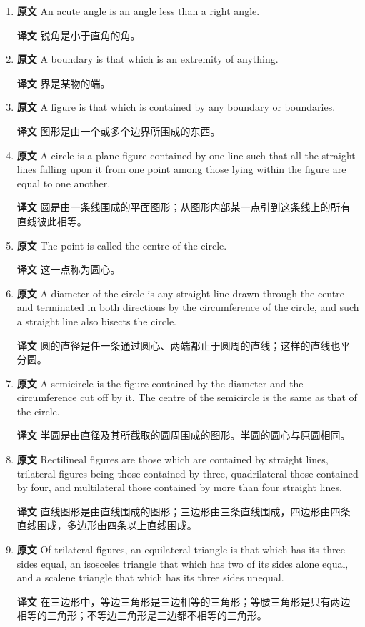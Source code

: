 \documentclass[UTF8,zihao=-4]{ctexart}
\begin{document}
\begin{enumerate}
\item \textbf{原文} An acute angle is an angle less than a right angle. \par\textbf{译文} 锐角是小于直角的角。
\item \textbf{原文} A boundary is that which is an extremity of anything. \par\textbf{译文} 界是某物的端。
\item \textbf{原文} A figure is that which is contained by any boundary or boundaries. \par\textbf{译文} 图形是由一个或多个边界所围成的东西。
\item \textbf{原文} A circle is a plane figure contained by one line such that all the straight lines falling upon it from one point among those lying within the figure are equal to one another. \par\textbf{译文} 圆是由一条线围成的平面图形；从图形内部某一点引到这条线上的所有直线彼此相等。
\item \textbf{原文} The point is called the centre of the circle. \par\textbf{译文} 这一点称为圆心。
\item \textbf{原文} A diameter of the circle is any straight line drawn through the centre and terminated in both directions by the circumference of the circle, and such a straight line also bisects the circle. \par\textbf{译文} 圆的直径是任一条通过圆心、两端都止于圆周的直线；这样的直线也平分圆。
\item \textbf{原文} A semicircle is the figure contained by the diameter and the circumference cut off by it. The centre of the semicircle is the same as that of the circle. \par\textbf{译文} 半圆是由直径及其所截取的圆周围成的图形。半圆的圆心与原圆相同。
\item \textbf{原文} Rectilineal figures are those which are contained by straight lines, trilateral figures being those contained by three, quadrilateral those contained by four, and multilateral those contained by more than four straight lines. \par\textbf{译文} 直线图形是由直线围成的图形；三边形由三条直线围成，四边形由四条直线围成，多边形由四条以上直线围成。
\item \textbf{原文} Of trilateral figures, an equilateral triangle is that which has its three sides equal, an isosceles triangle that which has two of its sides alone equal, and a scalene triangle that which has its three sides unequal. \par\textbf{译文} 在三边形中，等边三角形是三边相等的三角形；等腰三角形是只有两边相等的三角形；不等边三角形是三边都不相等的三角形。

\end{enumerate}
\end{document}
